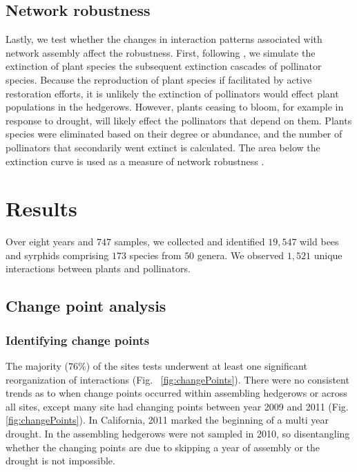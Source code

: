 \documentclass[12pt]{article}
\begin{document}
\subsection*{Network robustness}

Lastly, we test whether the changes in interaction patterns associated
with network assembly affect the robustness. First, following
\cite{Memmott2004}, we simulate the extinction of plant species the
subsequent extinction cascades of pollinator species. Because the
reproduction of plant species if facilitated by active restoration
efforts, it is unlikely the extinction of pollinators would effect
plant populations in the hedgerows. However, plants ceasing to bloom,
for example in response to drought, will likely effect the pollinators
that depend on them. Plants species were eliminated based on their
degree or abundance, and the number of pollinators that secondarily
went extinct is calculated. The area below the extinction curve is
used as a measure of network robustness \citep{Memmott2004}.


\section*{Results}
\label{sec:results}

Over eight years and $747$ samples, we collected and identified
$19,547$ wild bees and syrphids comprising $173$ species from $50$
genera. We observed $1,521$ unique interactions between plants and
pollinators.

\subsection*{Change point analysis}
\subsubsection*{Identifying change points}

The majority ($76\%$) of the sites tests underwent at least one
significant reorganization of interactions (Fig.~
\ref{fig:changePoints}). There were no consistent trends as to when
change points occurred within assembling hedgerows or across all sites,
except many site had changing points between year 2009 and 2011 (Fig.~
\ref{fig:changePoints}). In California, 2011 marked the beginning of a
multi year drought. In the assembling hedgerows were not sampled in
2010, so disentangling whether the changing points are due to skipping
a year of assembly or the drought is not impossible.
\end{document}
